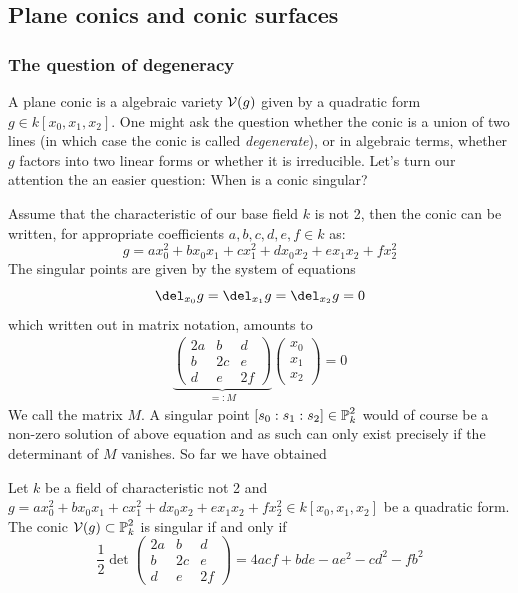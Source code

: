 \subsection{Plane conics and conic surfaces}

\subsubsection{The question of degeneracy}

A plane conic is a algebraic variety $\operatorname{\mathcal V}(g)$ given by a quadratic form $g \in k[x_0,x_1,x_2]$. One might ask the question whether the conic is a union of two lines (in which case the conic is called \emph{degenerate}), or in algebraic terms, whether $g$ factors into two linear forms or whether it is irreducible.
Let's turn our attention the an easier question: When is a conic singular?

Assume that the characteristic of our base field $k$ is not 2, then the conic can be written, for appropriate coefficients $a,b,c,d,e,f \in k$ as:
\begin{equation}
g = ax_0^2 + bx_0x_1 + cx_1^2 + dx_0x_2 + ex_1x_2 + fx_2^2
\end{equation}
The singular points are given by the system of equations
\begin{equation}
\del_{x_0} g = \del_{x_1} g = \del_{x_2} g = 0
\end{equation}
which written out in matrix notation, amounts to
\begin{align}
\underset{=:M}{\underbrace{
\begin{pmatrix}
2a & b & d \\
b & 2c & e \\
d & e & 2f
\end{pmatrix}
}}
\begin{pmatrix}
x_0 \\ x_1 \\ x_2
\end{pmatrix}
= 0
\end{align}
We call the matrix $M$.
A singular point $[s_0:s_1:s_2] \in \operatorname{\mathbb P}^2_k$ would of course be a non-zero solution of above equation and as such can only exist precisely if the determinant of $M$ vanishes.
So far we have obtained

\begin{corollary}
Let $k$ be a field of characteristic not 2 and $g =  ax_0^2 + bx_0x_1 + cx_1^2 + dx_0x_2 + ex_1x_2 + fx_2^2
\in k[x_0,x_1,x_2]$ be a quadratic form. The conic $\operatorname{\mathcal V}(g) \subset \operatorname{\mathbb P}^2_k$ is singular if and only if
\begin{equation}
\frac 12
\det
\begin{pmatrix}
2a & b & d \\
b & 2c & e \\
d & e & 2f
\end{pmatrix}
= 4acf + bde - ae^2 - cd^2 - fb^2
\end{equation}
\end{corollary}

